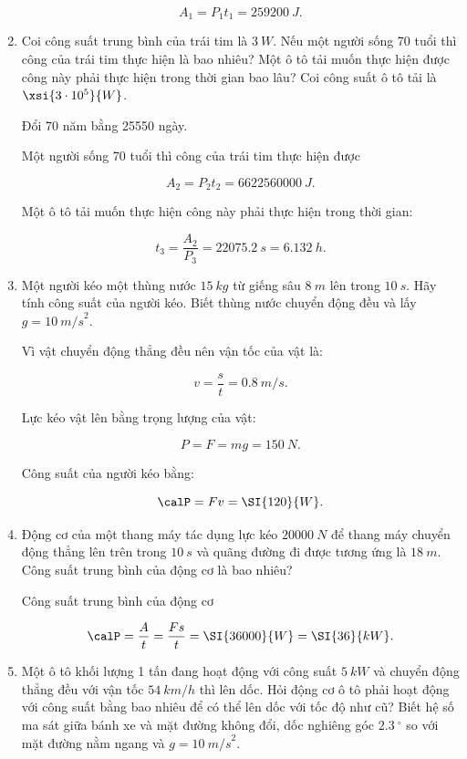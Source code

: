 \begin{enumerate}[label=\bfseries Câu \arabic*:, leftmargin=1.5cm]
{		$$A_1 = P_1t_1 = \SI{259200}{J}.$$
	}
	\item {}
	
	
	{
		Coi công suất trung bình của trái tim là $\SI{3}{W}$. Nếu một người sống 70 tuổi thì công của trái tim thực hiện là bao nhiêu? Một ô tô tải muốn thực hiện được công này phải thực hiện trong thời gian bao lâu? Coi công suất ô tô tải là $\xsi{3\cdot 10^5}{W}$.
	}
	
	\hideall
	{	
		
		
		Đổi 70 năm bằng 25550 ngày.
		
		Một người sống 70 tuổi thì công của trái tim thực hiện được
		
		$$A_2 = P_2t_2 = \SI{6622560000}{J}.$$
		
		Một ô tô tải muốn thực hiện công này phải thực hiện trong thời gian:
		
		$$t_3 = \dfrac{A_2}{P_3} = \SI{22075,2}{s} = \SI{6,132}{h}.$$
		
	}
	\item {}
	
	
	{
		Một người kéo một thùng nước $\SI{15}{kg}$ từ giếng sâu $\SI{8}{m}$ lên trong $\SI{10}{s}$. Hãy tính công suất của người kéo. Biết thùng nước chuyển động đều và lấy $g=\SI{10}{m/s}^2$.
	}
	
	\hideall
	{	
		Vì vật chuyển động thẳng đều nên vận tốc của vật là:
		
		$$v = \dfrac{s}{t} = \SI{0,8}{m/s}.$$
		
		Lực kéo vật lên bằng trọng lượng của vật:
		
		$$P = F = mg = \SI{150}{N}.$$
		
		Công suất của người kéo bằng:
		
		$$ \calP = Fv = \SI{120}{W}.$$
	}
	\item {}
	
	
	{
		Động cơ của một thang máy tác dụng lực kéo $\SI{20000}{N}$ để thang máy chuyển động thẳng lên trên trong $\SI{10}{s}$ và quãng đường đi được tương ứng là $\SI{18}{m}$. Công suất trung bình của động cơ là bao nhiêu?
	}
	
	\hideall
	{	
		Công suất trung bình của động cơ
		
		$$\calP = \dfrac{A}{t} = \dfrac{Fs}{t} = \SI{36000}{W}  = \SI{36}{kW}.$$
	}
	\item {}
	
	
	{
		Một ô tô khối lượng 1 tấn đang hoạt động với công suất $\SI{5}{kW}$ và chuyển động thẳng đều với vận tốc $\SI{54}{km/h}$ thì lên dốc. Hỏi động cơ ô tô phải hoạt động với công suất bằng bao nhiêu để có thể lên dốc với tốc độ như cũ? Biết hệ số ma sát giữa bánh xe và mặt đường không đổi, dốc nghiêng góc $\SI{2,3}{^\circ}$ so với mặt đường nằm ngang và $g = \SI{10}{m/s}^2.$
	}
	

\end{enumerate}
